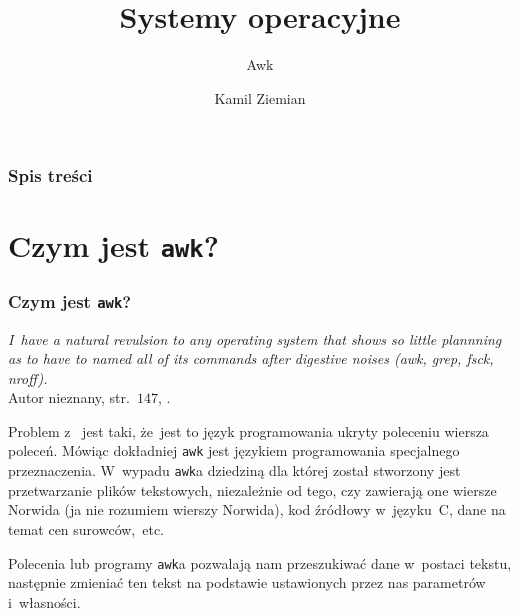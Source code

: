 \documentclass[10pt,t]{beamer}
\title{Systemy operacyjne}
\subtitle{Awk}
\author{Kamil Ziemian \\
  \email}
\begin{document}





\RaggedRight





\maketitle





\begin{frame}
  \frametitle{Spis treści}


  \tableofcontents

\end{frame}










\section{Czym jest \texttt{awk}?}


\begin{frame}
  \frametitle{Czym jest \texttt{awk}?}


  \textit{I~have a natural revulsion to any operating system that shows so
    little plannning as to have to named all of its commands after digestive
    noises (awk, grep, fsck, nroff).} \\
    Autor nieznany, str.~$147$,
    \parencite{Garfinkel-Weise-Strassmann-The-UNIX-HATERS-Handbook-Pub-1994}.

  Problem z~
  jest taki, że~jest to język programowania ukryty poleceniu wiersza
  poleceń. Mówiąc dokładniej \texttt{awk} jest językiem programowania
  specjalnego przeznaczenia. W~wypadu \texttt{awk}a dziedziną dla której
  został stworzony jest przetwarzanie plików tekstowych, niezależnie od
  tego, czy zawierają one wiersze Norwida (ja nie rozumiem wierszy
  Norwida), kod źródłowy w~języku~C, dane na temat cen surowców,~etc.

  Polecenia lub programy \texttt{awk}a pozwalają nam przeszukiwać dane
  w~postaci tekstu, następnie zmieniać ten tekst na podstawie ustawionych
  przez nas parametrów i~własności.

\end{frame}
\end{document}
